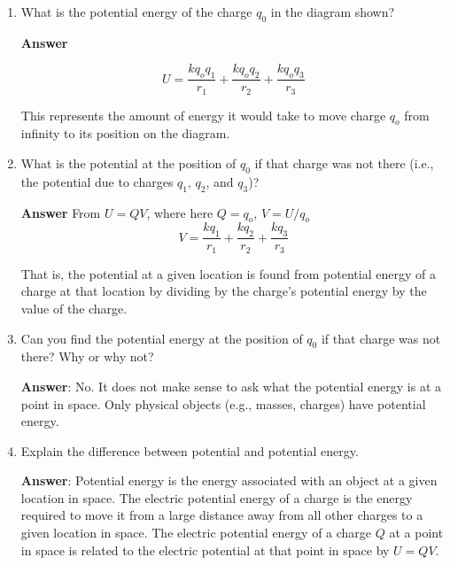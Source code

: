 \documentclass{article}
\begin{document}
\begin{enumerate}

  \item What is the potential energy of the charge $q_0$ in the diagram shown?

        \ifsolutions
          \textbf{Answer}
        
          \begin{equation}
        U = \frac{kq_oq_1}{r_1}+\frac{kq_oq_2}{r_2}+\frac{kq_oq_3}{r_3}
        \end{equation}
        
          This represents the amount of energy it would take to move charge $q_o$ from infinity to its position on the 
        diagram.
        \else
          \vskip 48pt
        \fi

  \item What is the potential at the position of $q_0$ if that charge was not there (i.e., the potential due to charges $q_1$, $q_2$, and $q_3$)?

        \ifsolutions
          \textbf{Answer} From $U=QV$, where here $Q=q_o$, $V=U/q_o$ 
        \begin{equation}
        V = \frac{kq_1}{r_1}+\frac{kq_2}{r_2}+\frac{kq_3}{r_3}
        \end{equation}
        
          That is, the potential at a given location is found from potential energy of a charge at that location by dividing by the charge's potential energy by the value of the charge.
        \else
          \vskip 48pt
        \fi

  \item Can you find the potential energy at the position of $q_0$ if that charge was not there? Why or why not?

        \ifsolutions
          \textbf{Answer}: No. It does not make sense to ask what the potential energy is at a point in space. Only physical objects (e.g., masses, charges) have potential energy.
        \else
          \vskip 48pt
        \fi

  \item Explain the difference between potential and potential energy.

        \ifsolutions
          \textbf{Answer}: Potential energy is the energy associated with an object at a given location in space. The electric potential energy of a charge is the energy required to move it from a large distance away from all other charges to a given location in space. The electric potential energy of a charge $Q$ at a point in space is related to the electric potential at that point in space by $U=QV$.
        \else
          \vskip 48pt
        \fi

\end{enumerate}
\end{document}
